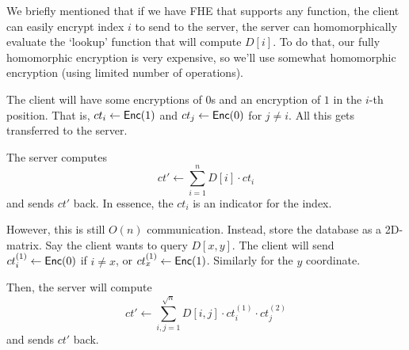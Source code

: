 We briefly mentioned that if we have FHE that supports any function, the client can easily encrypt index $i$ to send to the server, the server can homomorphically evaluate the `lookup' function that will compute $D[i]$. To do that, our fully homomorphic encryption is very expensive, so we'll use somewhat homomorphic encryption (using limited number of operations).

The client will have some encryptions of $0$s and an encryption of $1$ in the $i$-th position. That is, $ct_i \leftarrow \operatorname{\mathsf{Enc}}(1)$ and $ct_j \leftarrow \operatorname{\mathsf{Enc}}(0)$ for $j\neq i$. All this gets transferred to the server.

The server computes
\[ct'\leftarrow \sum^n_{i=1}D[i]\cdot ct_i\]
and sends $ct'$ back. In essence, the $ct_i$ is an indicator for the index.


However, this is still $O(n)$ communication. Instead, store the database as a 2D-matrix. Say the client wants to query $D[x,y]$. The client will send $ct_i^{(1)}\leftarrow \operatorname{\mathsf{Enc}}(0)$ if $i\neq x$, or $ct_x^{(1)}\leftarrow \operatorname{\mathsf{Enc}}(1)$. Similarly for the $y$ coordinate.

Then, the server will compute
\[ct'\leftarrow \sum^{\sqrt{n}}_{i,j=1}D[i,j]\cdot ct_i^{(1)}\cdot ct_j^{(2)}\]
and sends $ct'$ back.

